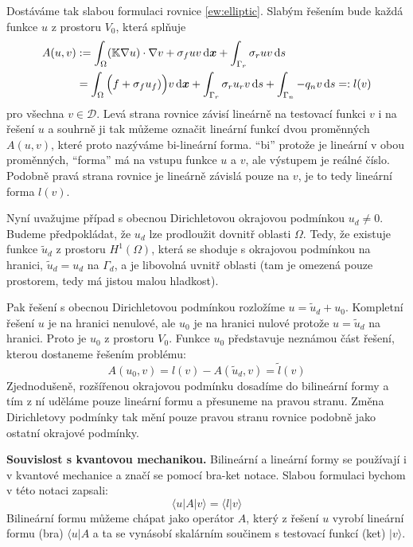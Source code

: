 Dostáváme tak slabou formulaci rovnice \eqref{ew:elliptic}. Slabým řešením bude každá funkce $u$ z prostoru $V_0$, 
která splňuje
\begin{align}
    \label{eq:weak_homo_dirich}
    A(u, v) &:= \int_\Omega ({\mathbb{K}}\nabla u) \cdot \nabla v   +   \sigma_f u v \,{\rm d} \mathbf{\boldsymbol{x}} 
              + \int_{\Gamma_r} \sigma_r u v \,{\rm d} s \\
              &=  \int_\Omega \Big(f + \sigma_f u_f)\Big)v \,{\rm d} \mathbf{\boldsymbol{x}} + \int_{\Gamma_r} \sigma_r u_r v \,{\rm d} s 
              + \int_{\Gamma_n} -q_n v \,{\rm d} s =: l(v)
\end{align}
pro všechna $v \in \mathcal D$. Levá strana rovnice závisí lineárně na testovací funkci $v$ i na řešení $u$ 
a souhrně ji tak můžeme označit lineární funkcí dvou proměnných $A(u, v)$, které proto nazýváme bi-lineární forma.
``bi'' protože je lineární v obou proměnných, ``forma'' má na vstupu funkce $u$ a $v$, ale výstupem je reálné číslo.
Podobně pravá strana rovnice je lineárně závislá pouze na $v$, je to tedy lineární forma $l(v)$.

Nyní uvažujme případ s obecnou Dirichletovou okrajovou podmínkou $u_d\ne 0$. 
Budeme předpokládat, že $u_d$ lze prodloužit dovnitř oblasti $\Omega$. Tedy, že existuje 
funkce $\tilde u_d$ z prostoru $H^1(\Omega)$, která se shoduje s okrajovou podmínkou na hranici,
 $\tilde u_d = u_d$ na $\Gamma_d$, a je libovolná uvnitř oblasti (tam je omezená pouze prostorem, tedy má jistou malou hladkost). 
 
 
Pak řešení s obecnou Dirichletovou podmínkou
rozložíme $u = \tilde u_d + u_0$. Kompletní řešení $u$ je na hranici nenulové, ale $u_0$ je na hranici nulové
protože $u=\tilde u_d$ na hranici. Proto je $u_0$ z prostoru $V_0$. Funkce $u_0$ představuje neznámou 
část řešení, kterou dostaneme řešením problému:
\[
    A(u_0, v) = l(v) - A(\tilde u_d, v) = \tilde l(v)
\]
Zjednodušeně, rozšířenou okrajovou podmínku dosadíme do bilineární formy a tím z ní uděláme pouze 
lineární formu a přesuneme na pravou stranu. Změna Dirichletovy podmínky tak mění pouze pravou stranu 
rovnice podobně jako ostatní okrajové podmínky.

{\bf Souvislost s kvantovou mechanikou.} Bilineární a lineární formy se používají i v kvantové mechanice 
a značí se pomocí bra-ket notace. Slabou formulaci bychom v této notaci zapsali:
\[
    \langle u | A | v \rangle = \langle l | v \rangle
\]
Bilineární formu můžeme chápat jako operátor $A$, který z řešení $u$ vyrobí lineární formu (bra) $\langle u| A$ a
ta se vynásobí skalárním součinem s testovací funkcí (ket) $|v\rangle$.


